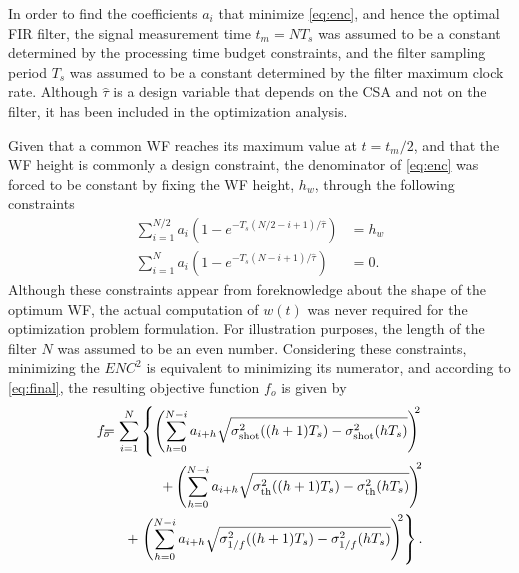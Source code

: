 In order to find the coefficients $a_i$ that minimize \eqref{eq:enc}, and hence the optimal FIR filter, the signal measurement time $t_m=NT_s$ was assumed to be a constant determined by the processing time budget constraints, and the filter sampling period $T_s$ was assumed to be a constant determined by the filter maximum clock rate. Although $\hat{\tau}$ is a design variable that depends on the CSA and not on the filter, it has been included in the optimization analysis. 

Given that a common WF reaches its maximum value at \mbox{$t=t_m/2$}, and that the WF height is commonly a design constraint, the denominator of \eqref{eq:enc} was forced to be constant by fixing the WF height, $h_{w}$, through the following constraints
	\begin{align}
		\sum_{i=1}^{N/2} a_{i}\left(1-e^{ - T_s(N/2-i+1)/\hat{\tau}}\right) &= h_w \label{eq:con1}\\
		\sum_{i=1}^{N} a_{i}\left(1-e^{-T_s(N-i+1)/\hat{\tau}}\right) &= 0 \label{eq:con2}.
	\end{align}
Although these constraints appear from foreknowledge about the shape of the optimum WF, the actual computation of $w(t)$ was never required for the optimization problem formulation. For illustration purposes, the length of the filter $N$ was assumed to be an even number. Considering these constraints, minimizing the $\mathit{ENC}^2$ is equivalent to minimizing its numerator, and according to \eqref{eq:final}, the resulting objective function $f_o$ is given by
	\begin{eqnarray} 
		f_o \hspace{-0.7em}&=  \hspace{-0.7em} &\sum_{i=1}^N \left\{\left( \sum_{h=0}^{N-i} a_{i+h} \sqrt{\sigma_\text{shot}^2((h+1)T_s)-\sigma_\text{shot}^2(hT_s)}\right)^{\hspace{-0.3em}2} \right.\nonumber\\
		\hspace{-1em}&  \hspace{-1em}&+ \left( \sum_{h=0}^{N-i} a_{i+h} \sqrt{\sigma_\text{th}^2((h+1)T_s)-\sigma_\text{th}^2(hT_s)}\right)^{\hspace{-0.3em}2} \nonumber\\
		\hspace{-1em}&  \hspace{-1em}& + \left.\left( \sum_{h=0}^{N-i} a_{i+h} \sqrt{\sigma_{1/f}^2((h+1)T_s)-\sigma_{1/f}^2(hT_s)}\right)^{\hspace{-0.3em}2} \right\} \nonumber. \\\label{eq:fo}
	\end{eqnarray}

